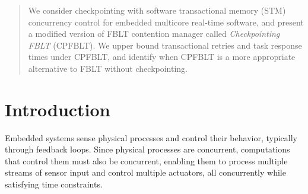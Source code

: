 \documentclass[conference]{IEEEtran}
\begin{document}
\begin{abstract}
We consider checkpointing with software transactional memory (STM) concurrency control for embedded multicore real-time software, and present a modified version of FBLT contention manager called \textit{Checkpointing FBLT} (CPFBLT). We upper bound transactional retries and task response times under CPFBLT, and identify when CPFBLT is a more appropriate alternative to FBLT without checkpointing.
\end{abstract}





%
\IEEEpeerreviewmaketitle



\section{Introduction}

\label{sec:intro}
%
Embedded systems sense physical processes and control their behavior, typically through feedback loops. Since physical processes are concurrent, computations that control them must also be concurrent, enabling them to process multiple streams of sensor input and control multiple actuators, all concurrently while satisfying time constraints. 
\end{document}
